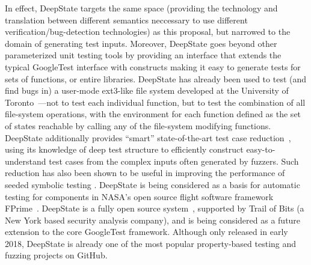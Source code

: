 
In effect, DeepState targets the same space (providing the technology and translation between different semantics neccessary to use different verification/bug-detection technologies) as this proposal, but narrowed to the domain of generating test inputs.  Moreover, DeepState goes beyond other parameterized unit testing tools by providing an interface that extends the typical GoogleTest interface with constructs making it easy to generate tests for sets of functions, or entire libraries.  DeepState has already been used to test (and find bugs in) a user-mode ext3-like file system developed at the University of Toronto~\cite{testfs,testfsrepo}---not to test each individual function, but to test the combination of all file-system operations, with the environment for each function defined as the set of states reachable by calling any of the file-system modifying functions.  DeepState additionally provides ``smart'' state-of-the-art test case reduction~\cite{OneTest}, using its knowledge of deep test structure to efficiently construct easy-to-understand test cases from the complex inputs often generated by fuzzers.  Such reduction has also been shown to be useful in improving the performance of seeded symbolic testing \cite{issta14}.
DeepState is being considered as a basis for automatic testing for components in NASA's open source flight software framework FPrime~\cite{fprime,fprimerepo}.  DeepState is a fully open source system~\cite{deepstaterepo}, supported by Trail of Bits (a New York based security analysis company), and is being considered as a future extension to the core GoogleTest framework.  Although only released in early 2018, DeepState is already one of the most popular property-based testing and fuzzing projects on GitHub.